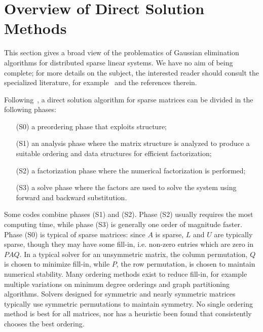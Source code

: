 \documentclass[acmtocl]{acmtrans2m}
\begin{document}
\section{Overview of Direct Solution Methods}
\label{sec:overview}

This section gives a broad view of the problematics of Gaussian elimination
algorithms for distributed sparse linear systems. We have no aim of being
complete; for more details on the subject, the interested reader should
consult the specialized literature, for
example~\cite{duff86direct,duff97sparse} and the references therein. 

\smallskip

Following~\cite[Chapter 6]{dongarra98numerical}, a direct solution algorithm
for sparse matrices can be divided in the following phases:
\begin{itemize}
\item[(S0)] a preordering phase that exploits structure;
\item[(S1)] an analysis phase where the matrix structure is analyzed to produce a
suitable ordering and data structures for efficient factorization;
\item[(S2)] a factorization phase where the numerical factorization is performed;
\item[(S3)] a solve phase where the factors are used to solve the system using
forward and backward substitution.
\end{itemize}
Some codes combine phases (S1) and (S2). Phase (S2) usually requires the most
computing time, while phase (S3) is generally one order of magnitude faster.
Phase (S0) is typical of sparse matrices:
since $A$ is sparse, $L$ and $U$ are typically sparse, though they may have some
fill-in, i.e. non-zero entries which are zero in $PAQ$.  
In a typical solver for an unsymmetric matrix, the column permutation,
$Q$ is chosen to minimize fill-in, while $P$, the row permutation, is
chosen to maintain numerical stability.  
Many ordering methods exist to reduce fill-in, for example multiple variations
on minimum degree orderings and graph partitioning algorithms.  Solvers
designed for symmetric and nearly symmetric matrices typically use symmetric
permutations to maintain symmetry.  No single ordering method is best for all
matrices, nor has a heuristic been found that consistently chooses the best
ordering\cite{BaumannFleischmannMutzbauer03,AmestoyDavisDuff03}. 
\end{document}
